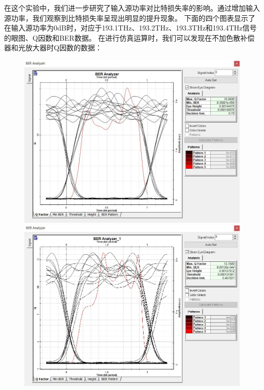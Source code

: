 \documentclass[12pt]{article}
\begin{document}
在这个实验中，我们进一步研究了输入源功率对比特损失率的影响。通过增加输入源功率，我们观察到比特损失率呈现出明显的提升现象。
下面的四个图表显示了在输入源功率为0dB时，对应于193.1THz、193.2THz、193.3THz和193.4THz信号的眼图、Q因数和BER数据。
在进行仿真运算时，我们可以发现在不加色散补偿器和光放大器时Q因数的数据：
\begin{figure}[H]
    \begin{minipage}[t]{0.5\linewidth}
        \centering
        \includegraphics[scale=0.3]{Q-factor (1).jpg}
        \caption{}
        \label{fig:side:a}
      \end{minipage}%
      \begin{minipage}[t]{0.5\linewidth}
        \centering
        \includegraphics[scale=0.3]{Q-factor (2).jpg}

\end{minipage}
\end{figure}
\end{document}
